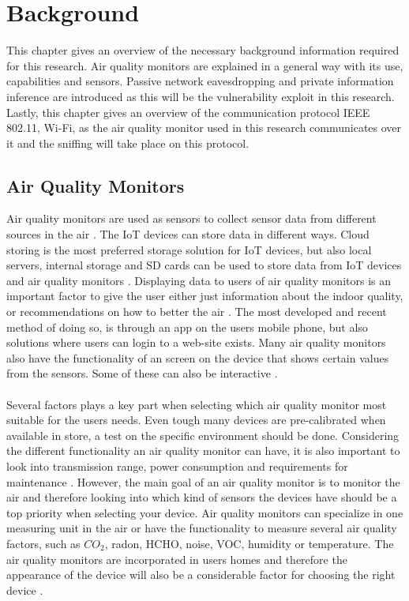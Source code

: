 \chapter{Background}
This chapter gives an overview of the necessary background information required for this research. Air quality monitors are explained in a general way with its use, capabilities and sensors. Passive network eavesdropping and private information inference are introduced as this will be the vulnerability exploit in this research. Lastly, this chapter gives an overview of the communication protocol IEEE 802.11, Wi-Fi, as the air quality monitor used in this research communicates over it and the sniffing will take place on this protocol.

\section{Air Quality Monitors}
Air quality monitors are used as sensors to collect sensor data from different sources in the air \cite{GeneralAirQualityMonitor}. The IoT devices can store data in different ways. Cloud storing is the most preferred storage solution for IoT devices, but also local servers, internal storage and SD cards can be used to store data from IoT devices and air quality monitors \cite{AQMBigSource}. Displaying data to users of air quality monitors is an important factor to give the user either just information about the indoor quality, or recommendations on how to better the air \cite{AQMBigSource}. The most developed and recent method of doing so, is through an app on the users mobile phone, but also solutions where users can login to a web-site exists. Many air quality monitors also have the functionality of an screen on the device that shows certain values from the sensors. Some of these can also be interactive \cite{AQMBigSource}.
\\\\
Several factors plays a key part when selecting which air quality monitor most suitable for the users needs. Even tough many devices are pre-calibrated when available in store, a test on the specific environment should be done. Considering the different functionality an air quality monitor can have, it is also important to look into transmission range, power consumption and requirements for maintenance \cite{AQMBigSource}. However, the main goal of an air quality monitor is to monitor the air and therefore looking into which kind of sensors the devices have should be a top priority when selecting your device. Air quality monitors can specialize in one measuring unit in the air or have the functionality to measure several air quality factors, such as \(CO_2\), radon, HCHO, noise, VOC, humidity or temperature. The air quality monitors are incorporated in users homes and therefore the appearance of the device will also be a considerable factor for choosing the right device \cite{IAQMonitorCommunicationReview}. 

